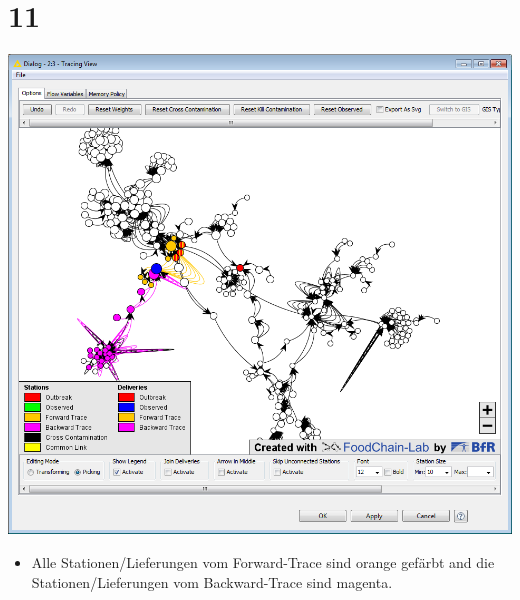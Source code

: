 \documentclass{beamer}
\begin{document}
\section{11}
\begin{frame}
	\begin{center}
  		\includegraphics[height=0.6\textheight]{11.png}
	\end{center}
	\begin{itemize}
		\item Alle Stationen/Lieferungen vom Forward-Trace sind orange gefärbt and die Stationen/Lieferungen vom Backward-Trace sind magenta.
	\end{itemize}
\end{frame}
\end{document}
